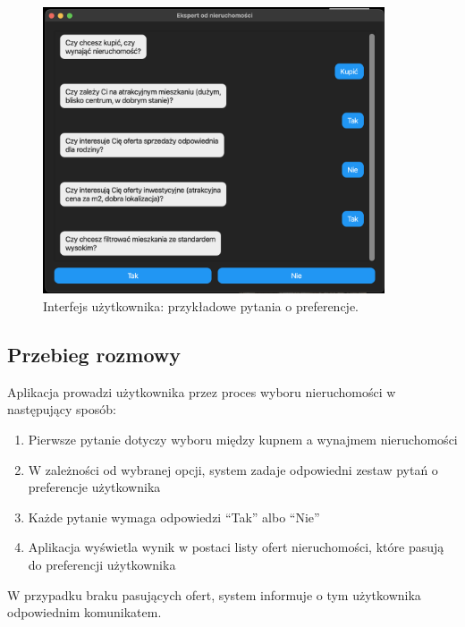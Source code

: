 \begin{figure}[H]
    \centering
    \includegraphics[width=0.9\textwidth]{images/preview-2.png}
    \caption{Interfejs użytkownika: przykładowe pytania o preferencje.}
    \label{fig:preview-2}
\end{figure}

\subsection{Przebieg rozmowy}

Aplikacja prowadzi użytkownika przez proces wyboru nieruchomości w następujący sposób:

\begin{enumerate}
    \item Pierwsze pytanie dotyczy wyboru między kupnem a wynajmem nieruchomości
    \item W zależności od wybranej opcji, system zadaje odpowiedni zestaw pytań o preferencje użytkownika
    \item Każde pytanie wymaga odpowiedzi ``Tak'' albo ``Nie''
    \item Aplikacja wyświetla wynik w postaci listy ofert nieruchomości, które pasują do preferencji użytkownika
\end{enumerate}
W przypadku braku pasujących ofert, system informuje o tym użytkownika odpowiednim komunikatem.
